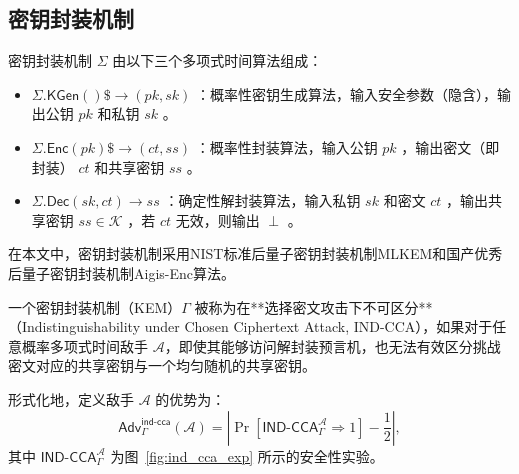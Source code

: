 \subsection{密钥封装机制}
密钥封装机制  $ \Sigma $  由以下三个多项式时间算法组成：
\begin{itemize}
    \item  $ \Sigma.\mathsf{KGen}()\$ \rightarrow (pk, sk) $ ：概率性密钥生成算法，输入安全参数（隐含），输出公钥  $ pk $  和私钥  $ sk $ 。

    \item  $ \Sigma.\mathsf{Enc}(pk)\$  \rightarrow (ct, ss) $ ：概率性封装算法，输入公钥  $ pk $ ，输出密文（即封装） $ ct $  和共享密钥  $ ss $ 。  
    \item  $ \Sigma.\mathsf{Dec}(sk, ct) \rightarrow ss $ ：确定性解封装算法，输入私钥  $ sk $  和密文  $ ct $ ，输出共享密钥  $ ss \in \mathcal{K} $ ，若  $ ct $  无效，则输出  $ \perp $ 。
\end{itemize}

在本文中，密钥封装机制采用NIST标准后量子密钥封装机制MLKEM和国产优秀后量子密钥封装机制Aigis-Enc算法。

\begin{definition}
一个密钥封装机制（KEM）$\Gamma$ 被称为在**选择密文攻击下不可区分**（Indistinguishability under Chosen Ciphertext Attack, IND-CCA），如果对于任意概率多项式时间敌手 $\mathcal{A}$，即使其能够访问解封装预言机，也无法有效区分挑战密文对应的共享密钥与一个均匀随机的共享密钥。

形式化地，定义敌手 $\mathcal{A}$ 的优势为：
\[
\mathsf{Adv}^{\mathsf{ind\text{-}cca}}_{\Gamma}(\mathcal{A}) 
= \left| \Pr\left[ \mathsf{IND\text{-}CCA}^{\mathcal{A}}_{\Gamma} \Rightarrow 1 \right] - \frac{1}{2} \right|,
\]
其中 $\mathsf{IND\text{-}CCA}^{\mathcal{A}}_{\Gamma}$ 为图~\ref{fig:ind_cca_exp} 所示的安全性实验。
\end{definition}

